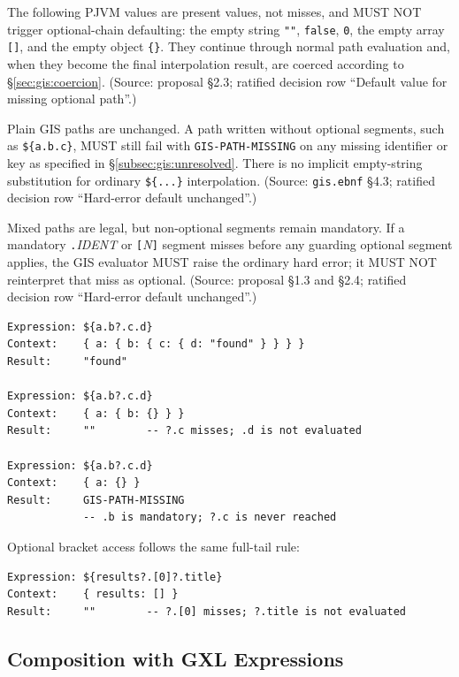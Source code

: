The following PJVM values are present values, not misses, and MUST NOT trigger
optional-chain defaulting: the empty string \texttt{""}, \texttt{false},
\texttt{0}, the empty array \texttt{[]}, and the empty object \texttt{\{\}}.
They continue through normal path evaluation and, when they become the final
interpolation result, are coerced according to \S\ref{sec:gis:coercion}.
(Source: proposal \S2.3; ratified decision row ``Default value for missing
optional path''.)

Plain GIS paths are unchanged.  A path written without optional segments, such
as \texttt{\$\{a.b.c\}}, MUST still fail with \texttt{GIS-PATH-MISSING} on any
missing identifier or key as specified in \S\ref{subsec:gis:unresolved}.  There
is no implicit empty-string substitution for ordinary \texttt{\$\{...\}}
interpolation.  (Source: \texttt{gis.ebnf} \S4.3; ratified decision row
``Hard-error default unchanged''.)

Mixed paths are legal, but non-optional segments remain mandatory.  If a
mandatory \texttt{.}\textit{IDENT} or \texttt{[}\textit{N}\texttt{]} segment
misses before any guarding optional segment applies, the GIS evaluator MUST
raise the ordinary hard error; it MUST NOT reinterpret that miss as optional.
(Source: proposal \S1.3 and \S2.4; ratified decision row ``Hard-error default
unchanged''.)

\begin{verbatim}
Expression: ${a.b?.c.d}
Context:    { a: { b: { c: { d: "found" } } } }
Result:     "found"

Expression: ${a.b?.c.d}
Context:    { a: { b: {} } }
Result:     ""        -- ?.c misses; .d is not evaluated

Expression: ${a.b?.c.d}
Context:    { a: {} }
Result:     GIS-PATH-MISSING
            -- .b is mandatory; ?.c is never reached
\end{verbatim}

\noindent Optional bracket access follows the same full-tail rule:

\begin{verbatim}
Expression: ${results?.[0]?.title}
Context:    { results: [] }
Result:     ""        -- ?.[0] misses; ?.title is not evaluated
\end{verbatim}

\subsection{Composition with GXL Expressions}
\label{subsec:gis:optional-chaining:composition}


